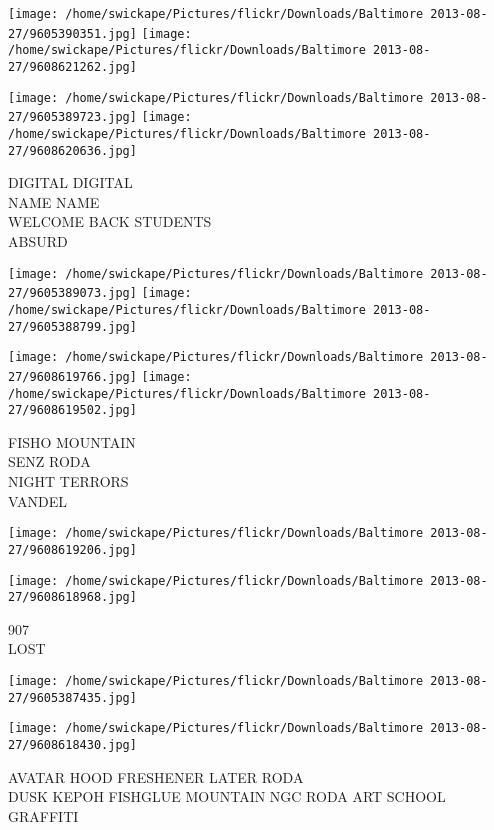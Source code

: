 \documentclass[10pt,letterpaper]{article}
\begin{document}
\texttt{[image: /home/swickape/Pictures/flickr/Downloads/Baltimore 2013-08-27/9605390351.jpg]}
\texttt{[image: /home/swickape/Pictures/flickr/Downloads/Baltimore 2013-08-27/9608621262.jpg]}

\texttt{[image: /home/swickape/Pictures/flickr/Downloads/Baltimore 2013-08-27/9605389723.jpg]}
\texttt{[image: /home/swickape/Pictures/flickr/Downloads/Baltimore 2013-08-27/9608620636.jpg]}

DIGITAL DIGITAL\\
NAME NAME\\
WELCOME BACK STUDENTS\\
ABSURD\\
\pagebreak

\texttt{[image: /home/swickape/Pictures/flickr/Downloads/Baltimore 2013-08-27/9605389073.jpg]}
\texttt{[image: /home/swickape/Pictures/flickr/Downloads/Baltimore 2013-08-27/9605388799.jpg]}

\texttt{[image: /home/swickape/Pictures/flickr/Downloads/Baltimore 2013-08-27/9608619766.jpg]}
\texttt{[image: /home/swickape/Pictures/flickr/Downloads/Baltimore 2013-08-27/9608619502.jpg]}

FISHO MOUNTAIN\\
SENZ RODA\\
NIGHT TERRORS\\
VANDEL\\
\pagebreak

\texttt{[image: /home/swickape/Pictures/flickr/Downloads/Baltimore 2013-08-27/9608619206.jpg]}

\vspace{0.25in}
\texttt{[image: /home/swickape/Pictures/flickr/Downloads/Baltimore 2013-08-27/9608618968.jpg]}

907\\
LOST\\
\pagebreak

\texttt{[image: /home/swickape/Pictures/flickr/Downloads/Baltimore 2013-08-27/9605387435.jpg]}

\vspace{0.25in}
\texttt{[image: /home/swickape/Pictures/flickr/Downloads/Baltimore 2013-08-27/9608618430.jpg]}

AVATAR HOOD FRESHENER LATER RODA\\
DUSK KEPOH FISHGLUE MOUNTAIN NGC RODA ART SCHOOL GRAFFITI\\
\pagebreak
\end{document}
